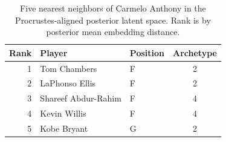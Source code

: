 \begin{table}[htbp]
  \centering\small
  \begin{tabular}{rllc}
    \toprule
    Rank & Player & Position & Archetype \\
    \midrule
    1 & Tom Chambers & F & 2 \\
    2 & LaPhonso Ellis & F & 2 \\
    3 & Shareef Abdur-Rahim & F & 4 \\
    4 & Kevin Willis & F & 4 \\
    5 & Kobe Bryant & G & 2 \\
    \bottomrule
  \end{tabular}
  \caption{Five nearest neighbors of Carmelo Anthony in the Procrustes-aligned posterior latent space. Rank is by posterior mean embedding distance.}
  \label{tab:Carmelo_Anthony_neighbors}
\end{table}

